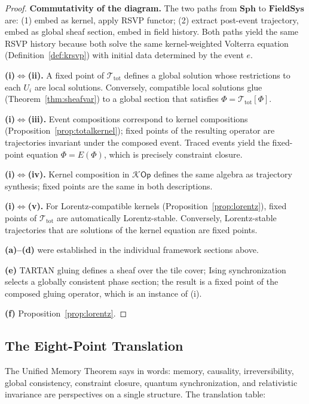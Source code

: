 \documentclass[12pt]{article}
\newcommand{\Kcal}{\mathcal{K}}
\begin{document}
\begin{proof}
\textbf{Commutativity of the diagram.} The two paths from $\mathbf{Sph}$
to $\mathbf{FieldSys}$ are: (1) embed as kernel, apply RSVP functor;
(2) extract post-event trajectory, embed as global sheaf section, embed
in field history. Both paths yield the same RSVP history because both
solve the same kernel-weighted Volterra equation (Definition~\ref{def:krsvp})
with initial data determined by the event $e$.

\textbf{(i)$\Leftrightarrow$(ii).} A fixed point of $\mathcal{T}_{\mathrm{tot}}$
defines a global solution whose restrictions to each $U_i$ are local solutions.
Conversely, compatible local solutions glue (Theorem~\ref{thm:sheafvar}) to a
global section that satisfies $\Phi = \mathcal{T}_{\mathrm{tot}}[\Phi]$.

\textbf{(i)$\Leftrightarrow$(iii).} Event compositions correspond to kernel
compositions (Proposition~\ref{prop:totalkernel}); fixed points of the
resulting operator are trajectories invariant under the composed event.
Traced events yield the fixed-point equation $\Phi = E(\Phi)$, which is
precisely constraint closure.

\textbf{(i)$\Leftrightarrow$(iv).} Kernel composition in $\Kcal\mathsf{Op}$
defines the same algebra as trajectory synthesis; fixed points are the
same in both descriptions.

\textbf{(i)$\Leftrightarrow$(v).} For Lorentz-compatible kernels
(Proposition~\ref{prop:lorentz}), fixed points of $\mathcal{T}_{\mathrm{tot}}$
are automatically Lorentz-stable. Conversely, Lorentz-stable trajectories
that are solutions of the kernel equation are fixed points.

\textbf{(a)--(d)} were established in the individual framework sections
above.

\textbf{(e)} TARTAN gluing defines a sheaf over the tile cover; Ising
synchronization selects a globally consistent phase section; the result is
a fixed point of the composed gluing operator, which is an instance of (i).

\textbf{(f)} Proposition~\ref{prop:lorentz}.
\end{proof}

\subsection{The Eight-Point Translation}

The Unified Memory Theorem says in words: memory, causality, irreversibility,
global consistency, constraint closure, quantum synchronization, and
relativistic invariance are perspectives on a single structure. The
translation table:
\end{document}

